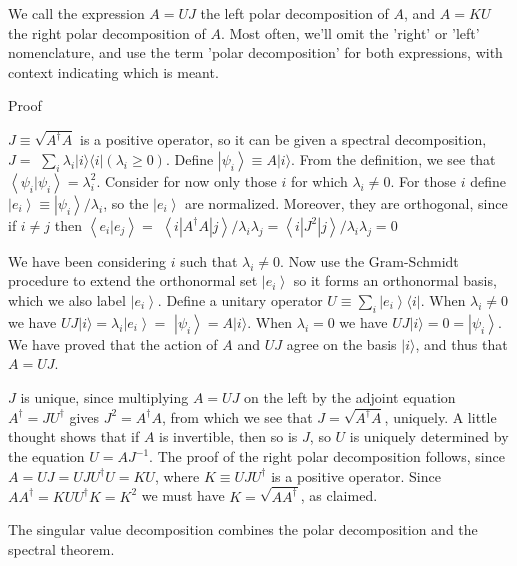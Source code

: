 \documentclass[
	11pt, %
	fleqn, %
	a4paper, %
]{LegrandOrangeBook}
\begin{document}
We call the expression $A=U J$ the left polar decomposition of $A$, and $A=K U$ the right polar decomposition of $A$. Most often, we'll omit the 'right' or 'left' nomenclature, and use the term 'polar decomposition' for both expressions, with context indicating which is meant.

Proof

$J \equiv \sqrt{A^{\dagger} A}$ is a positive operator, so it can be given a spectral decomposition, $J=$ $\sum_{i} \lambda_{i}|i\rangle\langle i|\left(\lambda_{i} \geq 0\right)$. Define $\left|\psi_{i}\right\rangle \equiv A|i\rangle$. From the definition, we see that $\left\langle\psi_{i} | \psi_{i}\right\rangle=\lambda_{i}^{2}$. Consider for now only those $i$ for which $\lambda_{i} \neq 0$. For those $i$ define $\left|e_{i}\right\rangle \equiv\left|\psi_{i}\right\rangle / \lambda_{i}$, so the $\left|e_{i}\right\rangle$ are normalized. Moreover, they are orthogonal, since if $i \neq j$ then $\left\langle e_{i} | e_{j}\right\rangle=$ $\left\langle i\left|A^{\dagger} A\right| j\right\rangle / \lambda_{i} \lambda_{j}=\left\langle i\left|J^{2}\right| j\right\rangle / \lambda_{i} \lambda_{j}=0$

We have been considering $i$ such that $\lambda_{i} \neq 0$. Now use the Gram-Schmidt procedure to extend the orthonormal set $\left|e_{i}\right\rangle$ so it forms an orthonormal basis, which we also label $\left|e_{i}\right\rangle$. Define a unitary operator $U \equiv \sum_{i}\left|e_{i}\right\rangle\langle i|$. When $\lambda_{i} \neq 0$ we have $U J|i\rangle=\lambda_{i}\left|e_{i}\right\rangle=$ $\left|\psi_{i}\right\rangle=A|i\rangle$. When $\lambda_{i}=0$ we have $U J|i\rangle=0=\left|\psi_{i}\right\rangle$. We have proved that the action of $A$ and $U J$ agree on the basis $|i\rangle$, and thus that $A=U J$.

$J$ is unique, since multiplying $A=U J$ on the left by the adjoint equation $A^{\dagger}=J U^{\dagger}$ gives $J^{2}=A^{\dagger} A$, from which we see that $J=\sqrt{A^{\dagger} A}$, uniquely. A little thought shows that if $A$ is invertible, then so is $J$, so $U$ is uniquely determined by the equation $U=A J^{-1}$. The proof of the right polar decomposition follows, since $A=U J=U J U^{\dagger} U=K U$, where $K \equiv U J U^{\dagger}$ is a positive operator. Since $A A^{\dagger}=K U U^{\dagger} K=K^{2}$ we must have $K=\sqrt{A A^{\dagger}}$, as claimed.

The singular value decomposition combines the polar decomposition and the spectral theorem.
\end{document}
